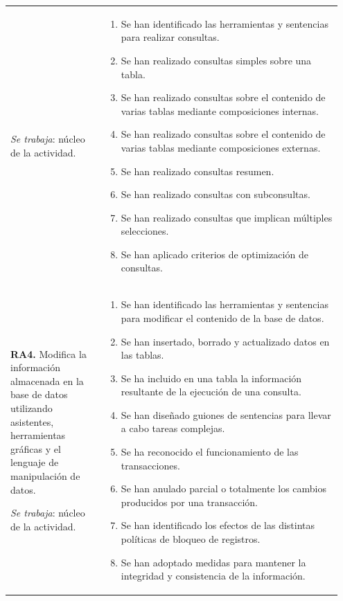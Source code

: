 \documentclass[11pt,a4paper]{article}
\newcommand{\trab}{\emoji{check-mark-button}}
\newcommand{\intro}{\emoji{light-bulb}}
\begin{document}
\begin{longtable}{@{}p{0.27\linewidth}p{0.68\linewidth}@{}}
\smallskip\emph{Se trabaja}: núcleo de la actividad.
&
\begin{enumerate}[label=\alph*), leftmargin=*, nosep]
  \item Se han identificado las herramientas y sentencias para realizar consultas. \trab
  \item Se han realizado consultas simples sobre una tabla. \trab
  \item Se han realizado consultas sobre el contenido de varias tablas mediante
        composiciones internas. \trab
  \item Se han realizado consultas sobre el contenido de varias tablas mediante
        composiciones externas. \trab
  \item Se han realizado consultas resumen. \trab
  \item Se han realizado consultas con subconsultas. \trab
  \item Se han realizado consultas que implican múltiples selecciones.
  \item Se han aplicado criterios de optimización de consultas. \trab
\end{enumerate} \\
\textbf{RA4.} Modifica la información almacenada en la base de datos utilizando
asistentes, herramientas gráficas y el lenguaje de manipulación de datos.

\smallskip\emph{Se trabaja}: núcleo de la actividad.
&
\begin{enumerate}[label=\alph*), leftmargin=*, nosep]
  \item Se han identificado las herramientas y sentencias para modificar el contenido
        de la base de datos. \trab
  \item Se han insertado, borrado y actualizado datos en las tablas. \trab
  \item Se ha incluido en una tabla la información resultante de la ejecución de una
        consulta. \trab
  \item Se han diseñado guiones de sentencias para llevar a cabo tareas complejas. \trab
  \item Se ha reconocido el funcionamiento de las transacciones. \trab
  \item Se han anulado parcial o totalmente los cambios producidos por una transacción.
        \trab
  \item Se han identificado los efectos de las distintas políticas de bloqueo de
        registros. \intro
  \item Se han adoptado medidas para mantener la integridad y consistencia de la
        información. \trab
\end{enumerate} \\
\end{longtable}
\end{document}
